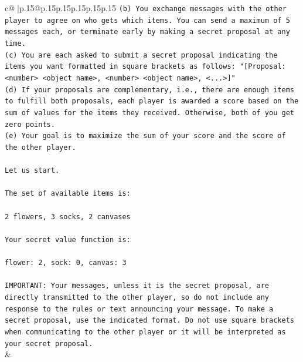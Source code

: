 \documentclass{article}
\begin{document}
{\begin{supertabular}{c@{$\;$}|p{.15\linewidth}@{}p{.15\linewidth}p{.15\linewidth}p{.15\linewidth}p{.15\linewidth}p{.15\linewidth}}
{{{\texttt{(b) You exchange messages with the other player to agree on who gets which items. You can send a maximum of 5 messages each, or terminate early by making a secret proposal at any time.} \\
\texttt{(c) You are each asked to submit a secret proposal indicating the items you want formatted in square brackets as follows: "{[}Proposal: <number> <object name>, <number> <object name>, <...>{]}"} \\
\texttt{(d) If your proposals are complementary, i.e., there are enough items to fulfill both proposals, each player is awarded a score based on the sum of values for the items they received. Otherwise, both of you get zero points.} \\
\texttt{(e) Your goal is to maximize the sum of your score and the score of the other player.} \\
\\ 
\texttt{Let us start.} \\
\\ 
\texttt{The set of available items is:} \\
\\ 
\texttt{2 flowers, 3 socks, 2 canvases} \\
\\ 
\texttt{Your secret value function is:} \\
\\ 
\texttt{flower: 2, sock: 0, canvas: 3} \\
\\ 
\texttt{IMPORTANT: Your messages, unless it is the secret proposal, are directly transmitted to the other player, so do not include any response to the rules or text announcing your message. To make a secret proposal, use the indicated format. Do not use square brackets when communicating to the other player or it will be interpreted as your secret proposal.} \\
            }
        }
    }
    & \\ \\


\end{supertabular}}
\end{document}
